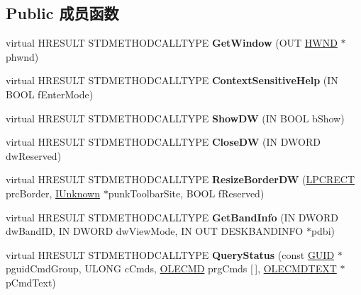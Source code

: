 \subsection*{Public 成员函数}
\begin{DoxyCompactItemize}
\item 
\mbox{\label{class_c_task_band_a8a3a6b67d9a76a6ce2a9dd76c4c6a143}} 
virtual H\+R\+E\+S\+U\+LT S\+T\+D\+M\+E\+T\+H\+O\+D\+C\+A\+L\+L\+T\+Y\+PE {\bfseries Get\+Window} (O\+UT \hyperlink{interfacevoid}{H\+W\+ND} $\ast$phwnd)
\item 
\mbox{\label{class_c_task_band_a5141f142e959df7d6a6cc0c24c8d9e55}} 
virtual H\+R\+E\+S\+U\+LT S\+T\+D\+M\+E\+T\+H\+O\+D\+C\+A\+L\+L\+T\+Y\+PE {\bfseries Context\+Sensitive\+Help} (IN B\+O\+OL f\+Enter\+Mode)
\item 
\mbox{\label{class_c_task_band_a466cfa730ccf91fac19142f165997f9b}} 
virtual H\+R\+E\+S\+U\+LT S\+T\+D\+M\+E\+T\+H\+O\+D\+C\+A\+L\+L\+T\+Y\+PE {\bfseries Show\+DW} (IN B\+O\+OL b\+Show)
\item 
\mbox{\label{class_c_task_band_a16571dbe81fb066dd89d614c7738bac9}} 
virtual H\+R\+E\+S\+U\+LT S\+T\+D\+M\+E\+T\+H\+O\+D\+C\+A\+L\+L\+T\+Y\+PE {\bfseries Close\+DW} (IN D\+W\+O\+RD dw\+Reserved)
\item 
\mbox{\label{class_c_task_band_a150d3cf1a5e490ca08602f3a716ba889}} 
virtual H\+R\+E\+S\+U\+LT S\+T\+D\+M\+E\+T\+H\+O\+D\+C\+A\+L\+L\+T\+Y\+PE {\bfseries Resize\+Border\+DW} (\hyperlink{structtag_r_e_c_t}{L\+P\+C\+R\+E\+CT} prc\+Border, \hyperlink{interface_i_unknown}{I\+Unknown} $\ast$punk\+Toolbar\+Site, B\+O\+OL f\+Reserved)
\item 
\mbox{\label{class_c_task_band_aa309be675d7633cf75fcdc4c86570674}} 
virtual H\+R\+E\+S\+U\+LT S\+T\+D\+M\+E\+T\+H\+O\+D\+C\+A\+L\+L\+T\+Y\+PE {\bfseries Get\+Band\+Info} (IN D\+W\+O\+RD dw\+Band\+ID, IN D\+W\+O\+RD dw\+View\+Mode, IN O\+UT D\+E\+S\+K\+B\+A\+N\+D\+I\+N\+FO $\ast$pdbi)
\item 
\mbox{\label{class_c_task_band_ad1abc9b8e8a01490d09f917425f6b0b1}} 
virtual H\+R\+E\+S\+U\+LT S\+T\+D\+M\+E\+T\+H\+O\+D\+C\+A\+L\+L\+T\+Y\+PE {\bfseries Query\+Status} (const \hyperlink{interface_g_u_i_d}{G\+U\+ID} $\ast$pguid\+Cmd\+Group, U\+L\+O\+NG c\+Cmds, \hyperlink{struct_i_ole_command_target_1_1__tag_o_l_e_c_m_d}{O\+L\+E\+C\+MD} prg\+Cmds \mbox{[}$\,$\mbox{]}, \hyperlink{struct_i_ole_command_target_1_1__tag_o_l_e_c_m_d_t_e_x_t}{O\+L\+E\+C\+M\+D\+T\+E\+XT} $\ast$p\+Cmd\+Text)

\end{DoxyCompactItemize}
